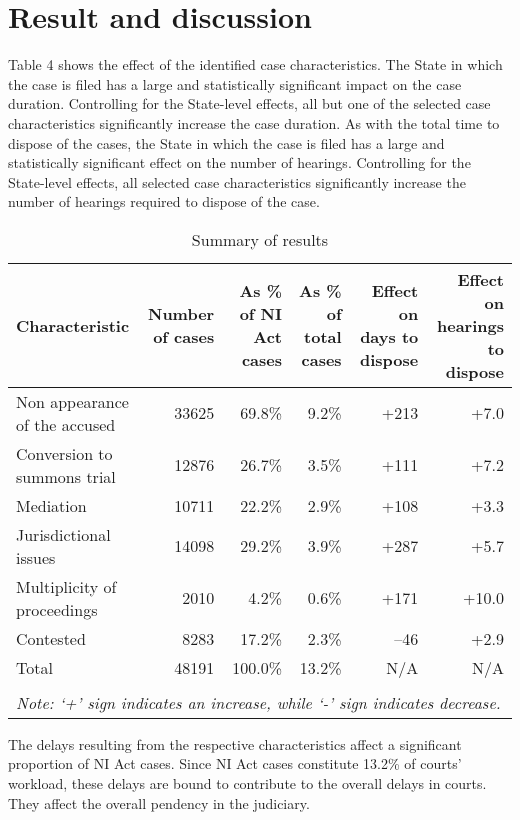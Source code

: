 \documentclass[12pt,a4paper]{article}
\begin{document}
\section{Result and discussion}

Table 4 shows the effect of the identified case characteristics. The State in which the case is filed has a large and statistically significant impact on the case duration. Controlling for the State-level effects, all but one of the selected case characteristics significantly increase the case duration. As with the total time to dispose of the cases, the State in which the case is filed has a large and statistically significant effect on the number of hearings. Controlling for the State-level effects, all selected case characteristics significantly increase the number of hearings required to dispose of the case.

{\footnotesize \begin{longtable}{@{}p{2.5cm}rrrrr}
 \caption{Summary of results}\label{tab:summary_results}\\
 \toprule
 \textbf{Characteristic} & \multicolumn{1}{p{2cm}}{\textbf{Number of cases}} &
 \multicolumn{1}{p{2cm}}{\textbf{As \% of NI Act cases}}
 & \multicolumn{1}{p{2cm}}{\textbf{As \% of total cases}}
 & \multicolumn{1}{p{2cm}}{\textbf{Effect on days to dispose}} &
 \multicolumn{1}{p{2cm}}{\textbf{Effect on hearings to dispose}}
 \\
 \midrule
 Non appearance of the accused & 33625 & 69.8\% & 9.2\% & +213 & +7.0 \\ \midrule
 Conversion to summons trial & 12876 & 26.7\% & 3.5\% & +111 & +7.2 \\ \midrule
 Mediation & 10711 & 22.2\% & 2.9\% & +108 & +3.3 \\ \midrule
 Jurisdictional issues & 14098 & 29.2\% & 3.9\% & +287 & +5.7 \\ \midrule
 Multiplicity of proceedings & 2010 & 4.2\% & 0.6\% & +171 & +10.0 \\ \midrule
 Contested & 8283 & 17.2\% & 2.3\% & --46 & +2.9 \\ \midrule
 Total & 48191 & 100.0\% & 13.2\% & N/A & N/A \\
 \bottomrule
 \\
 \multicolumn{6}{l}{{\footnotesize \emph{Note: `+' sign
 indicates an increase, while `-' sign indicates decrease.}}}\\
\end{longtable}
}

The delays resulting from the respective characteristics affect a significant proportion of NI Act cases. Since NI Act cases constitute 13.2\% of courts’ workload, these delays are bound to contribute to the overall delays in courts. They affect the overall pendency in the judiciary.
\end{document}
